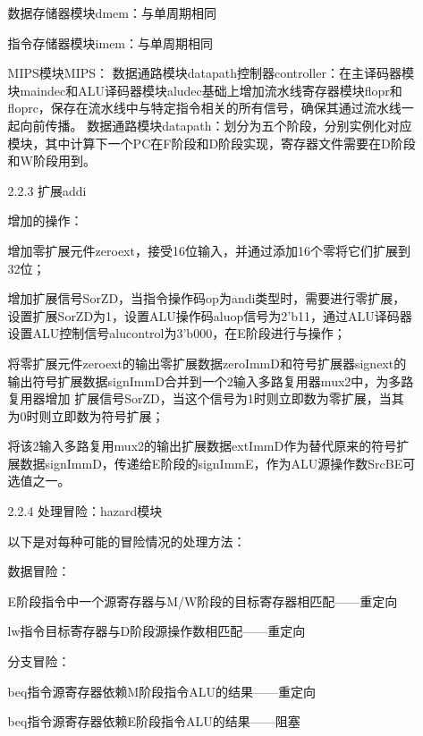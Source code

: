\documentclass[UTF8]{article}
\begin{document}
\begin{enumerate}
\begin{enumerate}
					数据存储器模块dmem：与单周期相同
					
					指令存储器模块imem：与单周期相同
					
					MIPS模块MIPS：
					数据通路模块datapath控制器controller：在主译码器模块maindec和ALU译码器模块aludec基础上增加流水线寄存器模块flopr和floprc，保存在流水线中与特定指令相关的所有信号，确保其通过流水线一起向前传播。
					数据通路模块datapath：划分为五个阶段，分别实例化对应模块，其中计算下一个PC在F阶段和D阶段实现，寄存器文件需要在D阶段和W阶段用到。
				\item [2.2.3] 扩展addi
					\par 增加的操作：
					
					增加零扩展元件zeroext，接受16位输入，并通过添加16个零将它们扩展到32位；
					
					增加扩展信号SorZD，当指令操作码op为andi类型时，需要进行零扩展，设置扩展SorZD为1，设置ALU操作码aluop信号为2'b11，通过ALU译码器设置ALU控制信号alucontrol为3'b000，在E阶段进行与操作；
					
					将零扩展元件zeroext的输出零扩展数据zeroImmD和符号扩展器signext的输出符号扩展数据signImmD合并到一个2输入多路复用器mux2中，为多路复用器增加 扩展信号SorZD，当这个信号为1时则立即数为零扩展，当其为0时则立即数为符号扩展；
					
					将该2输入多路复用mux2的输出扩展数据extImmD作为替代原来的符号扩展数据signImmD，传递给E阶段的signImmE，作为ALU源操作数SrcBE可选值之一。
				\item [2.2.4] 处理冒险：hazard模块
					\par 
					以下是对每种可能的冒险情况的处理方法：
					
					数据冒险：
					
					E阶段指令中一个源寄存器与M/W阶段的目标寄存器相匹配——重定向
					
					lw指令目标寄存器与D阶段源操作数相匹配——重定向
					
					分支冒险：
					
					beq指令源寄存器依赖M阶段指令ALU的结果——重定向
					
					beq指令源寄存器依赖E阶段指令ALU的结果——阻塞
					

\end{enumerate}
\end{enumerate}
\end{document}
